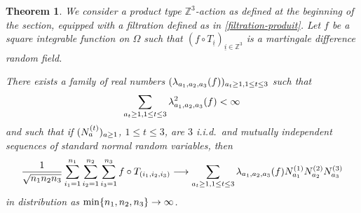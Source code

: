\documentclass[10pt]{amsart}
\newtheorem{theo}{Theorem}[section]
\theoremstyle{definition}\newtheorem{defi}[theo]{Definition}\newtheorem{rema}[theo]{Remark}\newtheorem{exam}[theo]{Example}\newtheorem{exem}[theo]{Example}\newtheorem{nota}[theo]{Notation}
\newcommand{\Z}{\mathbb{Z}}
\newcommand{\pr}[1]{\left(#1\right)}
\renewcommand*{\to}{\mathchoice{\longrightarrow}{\rightarrow}{\rightarrow}{\rightarrow}}
\let\originalleft\left
\let\originalright\right
\renewcommand{\left}{\mathopen{}\mathclose\bgroup\originalleft}
\renewcommand{\right}{\aftergroup\egroup\originalright}
\begin{document}
\begin{theo}\label{thm:TLC_product}
We consider a product type $\Z^3$-action as defined at the beginning of the section, equipped with a filtration defined as in \eqref{filtration-produit}. Let $f$ be a square integrable function on $\Omega$ such that $(f\circ T_{\underline{i}})_{\underline{i}\in\Z^3}$ is a martingale difference random field. 

There exists a family of real numbers $(\lambda_{a_1,a_2,a_3}\pr{f})_{a_t\geq 1, 1\leq t\leq 3}$
such that
\[
\sum_{a_t\geq 1, 1\leq t\leq 3}\lambda_{a_1,a_2,a_3}^2\pr{f}<\infty
\]
and such that if $(N_a^{\pr{t}})_{a\geq 1}$, $1\leq t\leq 3$, are $3$
i.i.d.\ and mutually independent sequences of standard normal random variables, then
\begin{equation*}
\frac1{\sqrt{n_1n_2 n_3}}\sum_{i_1=1}^{n_1}\sum_{i_2=1}^{n_2}\sum_{i_3=1}^{n_3} f\circ T_{(i_1,i_2,i_3)}\to \sum_{a_t\geq 1, 1\leq t\leq 3} \lambda_{a_1,a_2,a_3}\pr{f} N_{a_1}^{\pr{1}}N_{a_2}^{\pr{2}} N_{a_3}^{\pr{3}}
\end{equation*}
in distribution as $\min\{n_1,n_2,n_3\}\to\infty$.
\end{theo}
\end{document}
